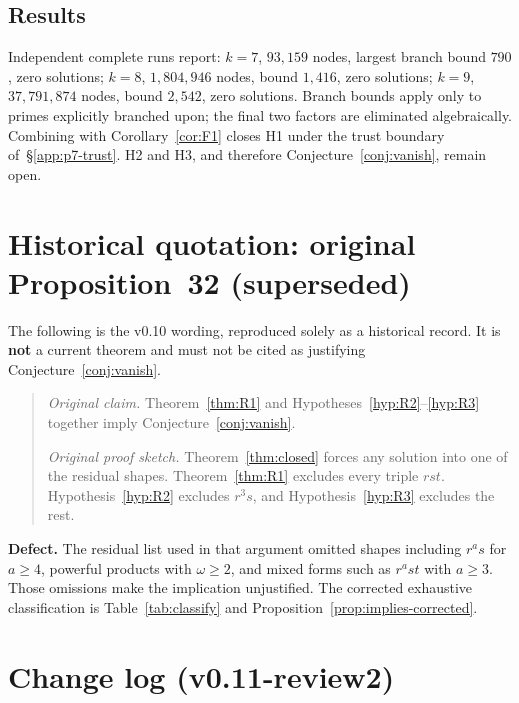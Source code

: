\documentclass[11pt,reqno]{amsart}
\theoremstyle{definition}
\begin{document}
\subsection{Results}
Independent complete runs report: \(k=7\), \(93{,}159\) nodes, largest branch bound \(790\), zero solutions; \(k=8\), \(1{,}804{,}946\) nodes, bound \(1{,}416\), zero solutions; \(k=9\), \(37{,}791{,}874\) nodes, bound \(2{,}542\), zero solutions. Branch bounds apply only to primes explicitly branched upon; the final two factors are eliminated algebraically. Combining with Corollary~\ref{cor:F1} closes H1 under the trust boundary of~\S\ref{app:p7-trust}. H2 and H3, and therefore Conjecture~\ref{conj:vanish}, remain open.

\section{Historical quotation: original Proposition~32 (superseded)}
\label{app:hist-prop32}

The following is the v0.10 wording, reproduced solely as a historical record. It is \textbf{not} a current theorem and must not be cited as justifying Conjecture~\ref{conj:vanish}.

\begin{quote}
\textit{Original claim.} Theorem~\ref{thm:R1} and Hypotheses~\ref{hyp:R2}--\ref{hyp:R3} together imply Conjecture~\ref{conj:vanish}.

\textit{Original proof sketch.} Theorem~\ref{thm:closed} forces any solution into one of the residual shapes. Theorem~\ref{thm:R1} excludes every triple \(rst\). Hypothesis~\ref{hyp:R2} excludes \(r^3s\), and Hypothesis~\ref{hyp:R3} excludes the rest.
\end{quote}

\textbf{Defect.} The residual list used in that argument omitted shapes including \(r^as\) for \(a\ge 4\), powerful products with \(\omega\ge 2\), and mixed forms such as \(r^ast\) with \(a\ge 3\). Those omissions make the implication unjustified. The corrected exhaustive classification is Table~\ref{tab:classify} and Proposition~\ref{prop:implies-corrected}.

\section{Change log (v0.11-review2)}
\label{app:changelog}
\end{document}
